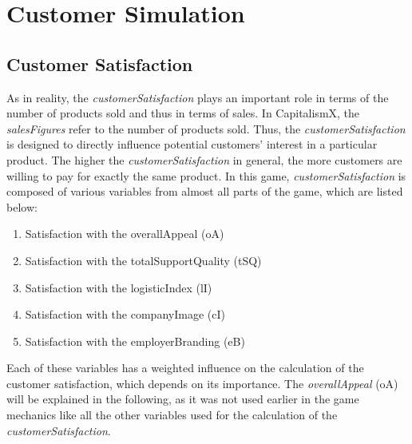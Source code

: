 \section{Customer Simulation} 
\label{sec:customsim}

\subsection{Customer Satisfaction}
\label{customerSatisfaction}



As in reality, the \textit{customerSatisfaction} plays an important role in terms of the number of products sold and thus in terms of sales. \cite{deptolla_effects_2004} In CapitalismX, the \textit{salesFigures} refer to the number of products sold.
Thus, the \textit{customerSatisfaction} is designed to directly influence potential customers' interest in a particular product. The higher the \textit{customerSatisfaction} in general, the more customers are willing to pay for exactly the same product. 
In this game, \textit{customerSatisfaction} is composed of various variables from almost all parts of the game, which are listed below:
\begin{enumerate}
      \item Satisfaction with the overallAppeal (oA)
      \item Satisfaction with the totalSupportQuality (tSQ)
      \item Satisfaction with the logisticIndex (lI)
      \item Satisfaction with the companyImage (cI)
      \item Satisfaction with the employerBranding (eB)
\end{enumerate}
Each of these variables has a weighted influence on the calculation of the customer satisfaction, which depends on its importance.
The \textit{overallAppeal} (oA) will be explained in the following, as it was not used earlier in the game mechanics like all the other variables used for the calculation of the \textit{customerSatisfaction}.

